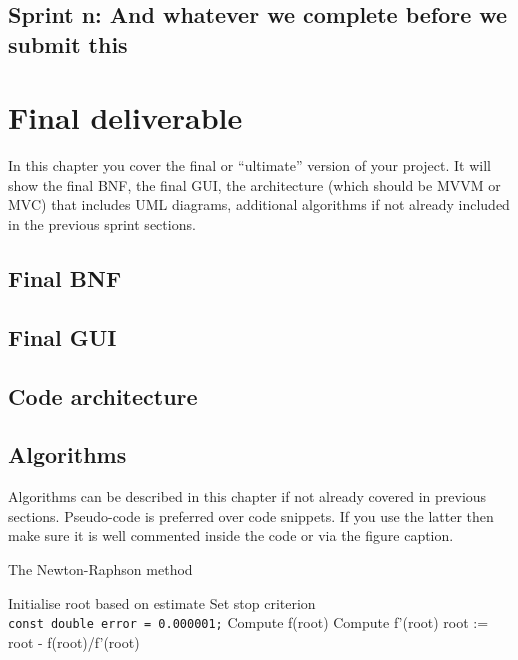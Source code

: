 \documentclass[a4paper, oneside, 11pt]{report}
\begin{document}
\section{Sprint n: And whatever we complete before we submit this}



\chapter{Final deliverable}\label{Impl}

In this chapter you cover the final or ``ultimate'' version of your project. It will show the final BNF, the final GUI, the architecture (which should be MVVM or MVC) that includes UML diagrams, additional algorithms if not already included in the previous sprint sections.

\section{Final BNF}

\section{Final GUI}

\section{Code architecture}
\label{code-arch}

\section{Algorithms}

Algorithms can be described in this chapter if not already covered in previous sections. Pseudo-code is preferred over code snippets. If you use the latter then make sure it is well commented inside the code or via the figure caption. 

\begin{algorithm}[th]
\caption{ The Newton-Raphson method }
\begin{algorithmic}[1]
\STATE Initialise root based on estimate
\STATE Set stop criterion
\\ \texttt{const double error = 0.000001;}
	\STATE Compute f(root)
	\STATE Compute f'(root)
	\STATE root := root - f(root)/f'(root)
\ENDWHILE
\end{algorithmic}
\end{algorithm}
\end{document}
